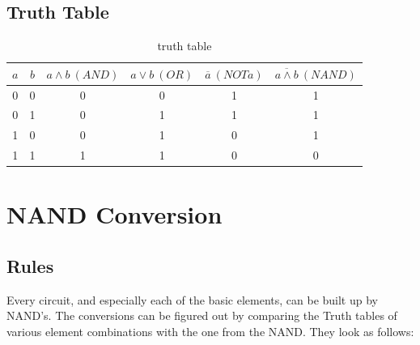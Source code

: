 \documentclass[10pt,a4paper]{article}
\begin{document}
    
  

\subsection{Truth Table}

\begin{table}[H]
\centering
  \begin{tabular}{c|c||c|c|c|c}
  \textbf{$a$} & \textbf{$b$} & \textbf{$a\land b \ (AND)$} & \textbf{$a\lor b\ (OR)$} & \textbf{$\overline{a}\ (NOT a)$}  & \textbf{ {$\overline{a\land  b}\ (NAND)$}} \\ \hline
  0          & 0          & 0            & 0            & 1                & 1      \\
  0          & 1          & 0            & 1            & 1                & 1  \\
  1          & 0          & 0            & 1            & 0                & 1   \\
  1          & 1          & 1            & 1            & 0                & 0  
  \end{tabular}
\caption{truth table}
\label{tab:truth}
\end{table}

\section{NAND Conversion}
\subsection{Rules}
Every circuit, and especially each of the basic elements, can be built up by NAND's. The conversions can be figured out by comparing the Truth tables of various element combinations with the one from the NAND. They look as follows: 
\end{document}

